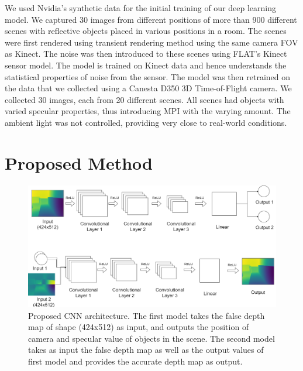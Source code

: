 \documentclass[runningheads]{llncs}
\begin{document}
We used Nvidia's synthetic data for the initial training of our deep learning model. 
We captured 30 images from different positions of more than 900 different scenes with reflective objects placed in various positions in a room. 
The scenes were first rendered using transient rendering method\cite{jarabo2014} using the same camera FOV as Kinect. 
The noise was then introduced to these scenes using FLAT's Kinect sensor model. 
The model is trained on Kinect data and hence understands the statistical properties of noise from the sensor. 
The model was then retrained on the data that we collected using a Canesta D350 3D Time-of-Flight camera. 
We collected 30 images, each from 20 different scenes. 
All scenes had objects with varied specular properties, thus introducing MPI with the varying amount. 
The ambient light was not controlled, providing very close to real-world conditions.



\section{Proposed Method}

\begin{figure}
    \centering
    \includegraphics[scale=0.25]{img/NN-model/CNN2.png}
    \caption{Proposed CNN architecture. The first model takes the false depth map of shape (424x512) as input, and outputs the position of camera and specular value of objects in the scene. The second model takes as input the false depth map as well as the output values of first model and provides the accurate depth map as output. }
    \label{fig:result_raw}
\end{figure}
\end{document}
